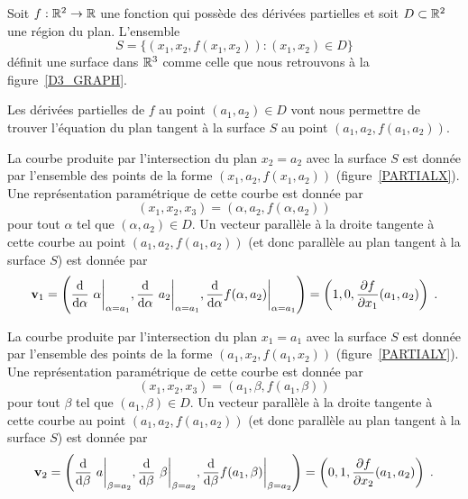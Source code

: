 {Soit $f:\mathbb{R}^2\rightarrow \mathbb{R}$ une fonction qui possède des dérivées
partielles et soit $D\subset \mathbb{R}^2$ une région du plan.  L'ensemble
\[
S = \{ (x_1,x_2,f(x_1,x_2)) : (x_1,x_2) \in D \}
\]
définit une surface dans $\mathbb{R}^3$ comme celle que nous retrouvons à la
figure~\ref{D3_GRAPH}.

Les dérivées partielles de $f$ au point $(a_1,a_2)\in D$ vont nous
permettre de trouver l'équation du plan tangent à la surface $S$ au
point $(a_1, a_2, f(a_1,a_2))$.

La courbe produite par l'intersection du plan $x_2=a_2$ avec la
surface $S$ est donnée par l'ensemble des points de la forme
$(x_1,a_2, f(x_1,a_2))$ (figure~\ref{PARTIALX}).  Une représentation
paramétrique de cette courbe est donnée par
\[
(x_1,x_2,x_3) = (\alpha, a_2, f(\alpha, a_2))
\]
pour tout $\alpha$ tel que $(\alpha,a_2)\in D$.  Un vecteur parallèle à la
droite tangente à cette courbe au point $(a_1,a_2,f(a_1,a_2))$ (et
donc parallèle au plan tangent à la surface $S$) est donnée par
\[
\VEC{v}_1 = \left( \dfdx{\ \alpha }{\alpha}\bigg|_{\alpha=a_1},
\dfdx{\ a_2 }{\alpha}\bigg|_{\alpha=a_1},
\dfdx{f(\alpha,a_2)}{\alpha}\bigg|_{\alpha=a_1} \right)
= \left(1,0, \pdydx{f}{x_1}(a_1,a_2) \right) \; .
\]



La courbe produite par l'intersection du plan $x_1=a_1$ avec la
surface $S$ est donnée par l'ensemble des points de la forme
$(a_1, x_2, f(a_1,x_2))$ (figure~\ref{PARTIALY}).  Une représentation
paramétrique de cette courbe est donnée par
\[
(x_1,x_2,x_3) = (a_1, \beta, f(a_1, \beta))
\]
pour tout $\beta$ tel que $(a_1,\beta)\in D$.  Un vecteur parallèle à
la droite tangente à cette courbe au point $(a_1,a_2,f(a_1,a_2))$ (et donc
parallèle au plan tangent à la surface $S$) est donnée par
\[
\VEC{v}_2 = \left( \dfdx{\ a}{\beta}\bigg|_{\beta=a_2},
\dfdx{\ \beta }{\beta}\bigg|_{\beta=a_2},
\dfdx{f(a_1,\beta)}{\beta}\bigg|_{\beta=a_2} \right)
= \left(0,1, \pdydx{f}{x_2}(a_1,a_2) \right) \; .
\]

}
